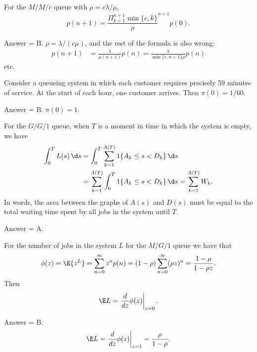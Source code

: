 \begin{exercise}[201704]%
For the $M/M/c$ queue with $\rho= c \lambda/\mu$, 
 \begin{equation*}
 p(n+1) = \frac{\Pi_{k=1}^{n+1}\min\{c, k\}}\rho^{n+1} p(0).
 \end{equation*}
\begin{solution} Answer = B. $\rho= \lambda/ (c\mu)$, and the rest of the formula is also wrong:
 \begin{align*}
 p(n+1) 
&= \frac{\lambda}{\mu(n+1)}p(n) 
= \frac{\lambda}{\min\{c, n+1\} \mu }p(n)
 \end{align*}
etc.
\end{solution}
\end{exercise}

\begin{exercise}[201704]%
 Consider a queueing system in which each customer requires precisely
 59 minutes of service. At the start of each hour, one customer arrives. Then
 $\pi(0) = 1/60$.
\begin{solution} Answer = B. $\pi(0)=1$.
\end{solution}
\end{exercise}

\begin{exercise}[201704]%
For the $G/G/1$ queue, when $T$ is a moment in time in which the system is empty, we have
\begin{equation*}
 \begin{split}
 \int_0^T L(s)\, \d s & = \int_0^T \sum_{k=1}^{A(T)} 1\{A_k \leq s < D_k\} \, \d s \\
& = \sum_{k=1}^{A(T)}\int_0^T 1\{A_k \leq s < D_k\} \, \d s = \sum_{k=1}^{A(T)} W_k.
 \end{split}
\end{equation*}
In words, the area between the graphs of $A(s)$ and $D(s)$ must
be equal to the total waiting time spent by all jobs in the system
until $T$. 
\begin{solution} Answer = A.
\end{solution}
\end{exercise}

\begin{exercise}[201704]%
 For the number of jobs in the system $L$ for the $M/G/1$ queue we have that
\begin{equation*}
 \phi(z) = \E{z^L} = \sum_{n=0}^\infty z^n p(n) = (1-\rho) \sum_{n=0}^\infty (\rho z)^n = \frac{1-\rho}{1-\rho z}.
\end{equation*}
Then 
\begin{equation*}
 \E L = \left.\frac d {dz} \phi(z)\right|_{z=0}.
\end{equation*}

\begin{solution} Answer = B.
\begin{equation*}
 \E L = \left.\frac d {dz} \phi(z)\right|_{z=1} = \frac{\rho}{1-\rho}.
\end{equation*}
\end{solution}
\end{exercise}


